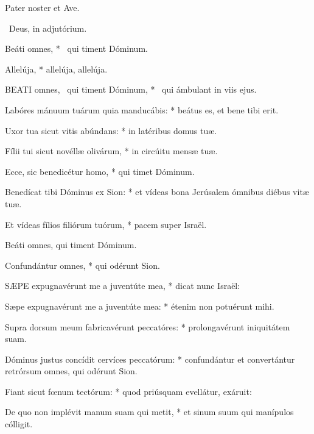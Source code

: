 

Pater noster et Ave.

\V\ Deus, in adjutórium.


 Beáti omnes, * \textdagger\ qui timent Dóminum. \textdaggerdbl


 Allelúja, * allelúja, allelúja.


\lettrine[lines=2]{B}{EATI} omnes, \textdagger\ qui timent Dóminum, * \textdaggerdbl\ qui ámbulant in viis ejus.

Labóres mánuum tuárum quia manducábis: * beátus es, et bene tibi erit.

Uxor tua sicut vitis abúndans: * in latéribus domus tuæ.

Fílii tui sicut novéllæ olivárum, * in circúitu mensæ tuæ.

Ecce, sic benedicétur homo, * qui timet Dóminum.

Benedícat tibi Dóminus ex Sion: * et vídeas bona Jerúsalem ómnibus diébus vitæ tuæ.

Et vídeas fílios filiórum tuórum, * pacem super Israël.

 Beáti omnes, qui timent Dóminum.

 Confundántur omnes, * qui odérunt Sion.


\lettrine[lines=2]{S}{ÆPE} expugnavérunt me a juventúte mea, * dicat nunc Israël:

Sæpe expugnavérunt me a juventúte mea: * étenim non potuérunt mihi.

Supra dorsum meum fabricavérunt peccatóres: * prolongavérunt iniquitátem suam.

Dóminus justus concídit cervíces peccatórum: * confundántur et convertántur retrórsum omnes, qui odérunt Sion.

Fiant sicut fœnum tectórum: * quod priúsquam evellátur, exáruit:

De quo non implévit manum suam qui metit, * et sinum suum qui manípulos cólligit.

